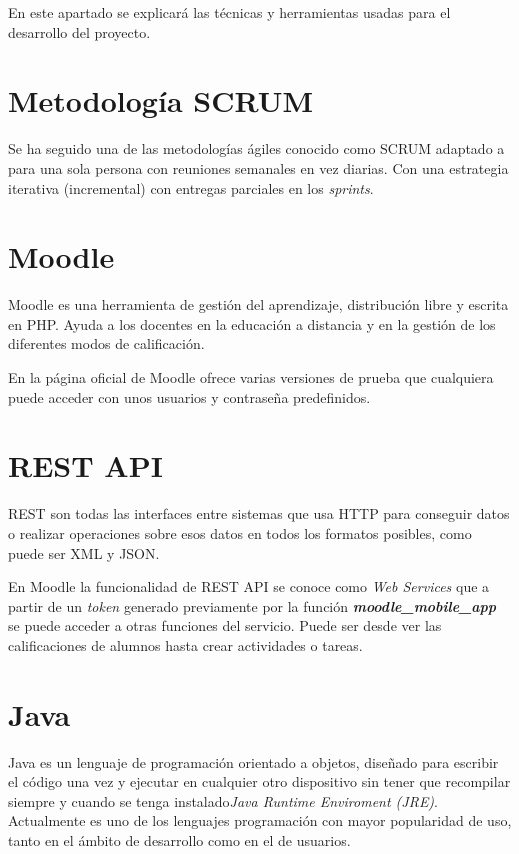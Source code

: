 
En este apartado se explicará las técnicas y herramientas usadas para el desarrollo del proyecto.

\section{Metodología SCRUM}

Se ha seguido una de las metodologías ágiles conocido como SCRUM adaptado a para una sola persona con reuniones semanales en vez diarias. Con una estrategia iterativa (incremental) con entregas parciales en los \textit{sprints}.

\section{Moodle}
Moodle es una herramienta de gestión del aprendizaje, distribución libre y escrita en PHP. Ayuda a los docentes en la educación a distancia y en la gestión de los diferentes modos de calificación.

En la página oficial de Moodle ofrece varias versiones de prueba que cualquiera puede acceder con unos usuarios y contraseña predefinidos.
\section{REST API}
REST\cite{noauthor_api_nodate} son todas las interfaces entre sistemas que usa HTTP para conseguir datos o realizar operaciones sobre esos datos en todos los formatos posibles, como puede ser XML y JSON.

En Moodle la funcionalidad de REST API se conoce como \textit{Web Services} que a partir de un \textit{token} generado previamente por la función \textbf{\textit{moodle\_mobile\_app}} se puede acceder a otras funciones del servicio. Puede ser desde ver las calificaciones de alumnos hasta crear actividades o tareas.


\section{Java}
Java es un lenguaje de programación orientado a objetos, diseñado para escribir el código una vez y ejecutar en cualquier otro dispositivo sin tener que recompilar siempre y cuando se tenga instalado\textit{Java Runtime Enviroment (JRE)}. Actualmente es uno de los lenguajes programación con mayor popularidad de uso, tanto en el ámbito de desarrollo como en el de usuarios.

